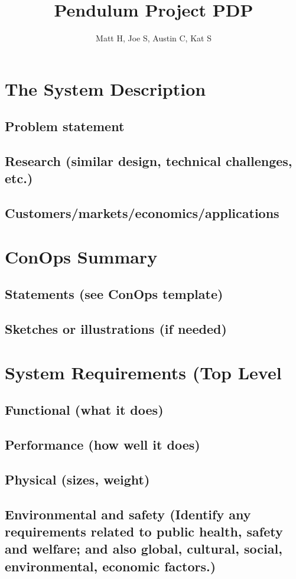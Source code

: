 \documentclass[a4paper,10pt]{article}
\title{Pendulum Project PDP}
\author{Matt H, Joe S, Austin C, Kat S}
\begin{document}
\maketitle

\tableofcontents
\pagebreak


\section{The System Description}
\subsection{Problem statement}
\subsection{Research (similar design, technical challenges, etc.)}
\subsection{Customers/markets/economics/applications}
\section{ConOps Summary}
\subsection{Statements (see ConOps template)}
\subsection{Sketches or illustrations (if needed)}
\section{System Requirements (Top Level}
\subsection{Functional (what it does)}
\subsection{Performance (how well it does)}
\subsection{Physical (sizes, weight)}
\subsection{Environmental and safety (Identify any requirements related to public health, safety and welfare; and also global, cultural, social, environmental, economic factors.)}
\end{document}

